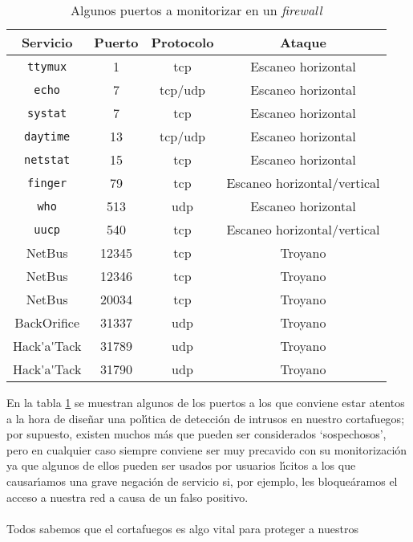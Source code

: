 \begin{table}
\begin{center}
\begin{tabular}{|c|c|c||c|}
\hline
Servicio & Puerto & Protocolo & Ataque\\
\hline\hline
{\tt ttymux} & 1 & {\sc tcp} & Escaneo horizontal\\
\hline
{\tt echo} & 7 & {\sc tcp}/{\sc udp} & Escaneo horizontal\\
\hline
{\tt systat} & 7 & {\sc tcp} & Escaneo horizontal\\
\hline
{\tt daytime} & 13 & {\sc tcp}/{\sc udp} & Escaneo horizontal\\
\hline
{\tt netstat} & 15 & {\sc tcp} & Escaneo horizontal\\
\hline
{\tt finger} & 79 & {\sc tcp} & Escaneo horizontal/vertical\\
\hline
{\tt who} & 513 & {\sc udp} & Escaneo horizontal\\
\hline
{\tt uucp} & 540 & {\sc tcp} & Escaneo horizontal/vertical\\
\hline
NetBus & 12345 & {\sc tcp} & Troyano\\
\hline
NetBus & 12346 & {\sc tcp} & Troyano\\
\hline
NetBus & 20034 & {\sc tcp} & Troyano\\
\hline
BackOrifice & 31337 & {\sc udp} & Troyano\\
\hline
Hack\'{}a\'{}Tack & 31789 & {\sc udp} & Troyano\\
\hline
Hack\'{}a\'{}Tack & 31790 & {\sc udp} & Troyano\\
\hline
\end{tabular}
\end{center}
\caption{Algunos puertos a monitorizar en un {\it firewall}}
\label{puertos}
\end{table}
En la tabla \ref{puertos} se muestran algunos de los puertos a los que conviene 
estar atentos a la hora de dise\~nar una pol\'{\i}tica de detecci\'on de 
intrusos en nuestro cortafuegos; por supuesto, existen muchos m\'as que pueden 
ser considerados `sospechosos', pero en cualquier caso siempre conviene ser muy 
precavido con su monitorizaci\'on ya que algunos de ellos pueden ser usados
por usuarios l\'{\i}citos a los que causar\'{\i}amos una grave negaci\'on de
servicio si, por ejemplo, les bloque\'aramos el acceso a nuestra red a causa de
un falso positivo.\\
\\Todos sabemos que el cortafuegos es algo vital para proteger a nuestros 
